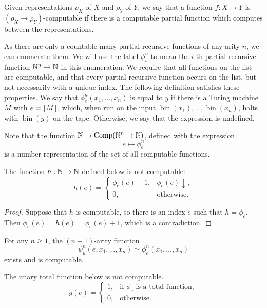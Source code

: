 Given representations $\rho_X$ of $X$ and $\rho_Y$ of $Y$, we say that a
function $f: X \to Y$ is $(\rho_X \to \rho_Y)$-computable if there is a
computable partial function which computes between the representations.

As there are only a countable many partial recursive functions of any arity $n$,
we can enumerate them.
We will use the label $\phi_i^n$ to mean the $i$-th partial recursive function
$\mathbb{N}^n \rightharpoonup \mathbb{N}$ in this enumeration.
We require that all functions on the list are computable, and that every partial
recursive function occurs on the list, but not necessarily with a unique index.
The following definition satisfies these properties.
We say that $\phi_e^n(x_1, \ldots, x_n)$ is equal to $y$ if there is a
Turing machine $M$ with $e = \lceil M \rceil$, which, when run on the input
$\operatorname{bin}(x_1), \ldots, \operatorname{bin}(x_n)$, halts with
$\operatorname{bin}(y)$ on the tape.
Otherwise, we say that the expression is undefined.

Note that the function $\mathbb{N} \to \operatorname{Comp}(\mathbb{N}^n \to \mathbb{N})$, defined with
the expression
\[
  e \mapsto \phi_e^n
\]
is a number representation of the set of all computable functions.


\begin{proposition}
  The function $h: \mathbb{N} \to \mathbb{N}$ defined below is not computable:
  \[
	h(e) =
	\begin{cases}
	  \phi_e(e) + 1, & \phi_e(e) \downarrow, \\
	  0, & \text{otherwise}.
	\end{cases}
  \]
\end{proposition}

\begin{proof}
  Suppose that $h$ is computable, so there is an index $e$ such that $h =
  \phi_e$.
  Then $\phi_e(e) = h(e) = \phi_e(e) + 1$, which is a contradiction.
\end{proof}

\begin{theorem}
  For any $n \ge 1$, the $(n+1)$-arity function
  \[
	\psi_u^n(e, x_1, \ldots, x_n) \simeq \phi_e^n(x_1, \ldots, x_n)
  \]
  exists and is computable.
\end{theorem}

\begin{proposition}
  The unary total function below is not computable.
  \[
	g(e) =
	\begin{cases}
	  1, & \text{if $\phi_e$ is a total function}, \\
	  0, & \text{otherwise}.
	\end{cases}
  \]
\end{proposition}

